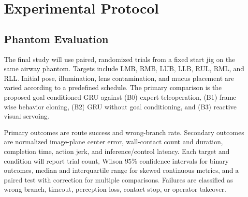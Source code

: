 \documentclass[letterpaper,10pt,conference]{ieeeconf}
\begin{document}
\begin{table}[t]
\caption{Design Context in Autonomous Bronchoscopy}
\label{tab:comparison}
\centering\small
{}
\end{table}

\section{Experimental Protocol}
\label{sec:protocol}

\subsection{Phantom Evaluation}

The final study will use paired, randomized trials from a fixed start jig on
the same airway phantom. Targets include LMB, RMB, LUB, LLB, RUL, RML, and RLL.
Initial pose, illumination, lens contamination, and mucus placement are varied
according to a predefined schedule. The primary comparison is the proposed
goal-conditioned GRU against (B0) expert teleoperation, (B1) frame-wise behavior
cloning, (B2) GRU without goal conditioning, and (B3) reactive visual servoing.

Primary outcomes are route success and wrong-branch rate. Secondary outcomes
are normalized image-plane center error, wall-contact count and duration,
completion time, action jerk, and inference/control latency. Each target and
condition will report trial count, Wilson 95\% confidence intervals for binary
outcomes, median and interquartile range for skewed continuous metrics, and a
paired test with correction for multiple comparisons. Failures are classified
as wrong branch, timeout, perception loss, contact stop, or operator takeover.
\end{document}
